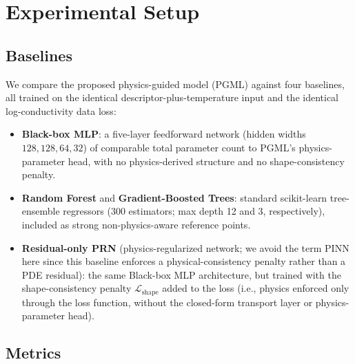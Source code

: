 \documentclass[11pt]{article}
\begin{document}
\section{Experimental Setup}

\subsection{Baselines}

We compare the proposed physics-guided model (PGML) against four baselines, all trained on the identical descriptor-plus-temperature input and the identical log-conductivity data loss:
\begin{itemize}
\item \textbf{Black-box MLP}: a five-layer feedforward network (hidden widths $128,128,64,32$) of comparable total parameter count to PGML's physics-parameter head, with no physics-derived structure and no shape-consistency penalty.
\item \textbf{Random Forest} and \textbf{Gradient-Boosted Trees}: standard scikit-learn tree-ensemble regressors (300 estimators; max depth 12 and 3, respectively), included as strong non-physics-aware reference points.
\item \textbf{Residual-only PRN} (physics-regularized network; we avoid the term PINN here since this baseline enforces a physical-consistency penalty rather than a PDE residual): the same Black-box MLP architecture, but trained with the shape-consistency penalty $\mathcal{L}_{\text{shape}}$ added to the loss (i.e., physics enforced only through the loss function, without the closed-form transport layer or physics-parameter head).
\end{itemize}

\subsection{Metrics}
\end{document}
